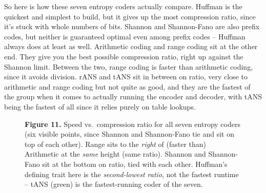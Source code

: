 \documentclass[11pt]{article}
\begin{document}
So here is how these seven entropy coders actually compare. Huffman is the
quickest and simplest to build, but it gives up the most compression ratio,
since it's stuck with whole numbers of bits. Shannon and Shannon-Fano are
also prefix codes, but neither is guaranteed optimal even among prefix codes
-- Huffman always does at least as well. Arithmetic coding and range coding
sit at the other end. They give you the best possible compression ratio,
right up against the Shannon limit. Between the two, range coding is faster
than arithmetic coding, since it avoids division. rANS and tANS sit in
between on ratio, very close to arithmetic and range coding but not quite as
good, and they are the fastest of the group when it comes to actually running
the encoder and decoder, with tANS being the fastest of all since it relies
purely on table lookups.

\begin{figure}[H]
\centering
{}
\caption*{\textbf{Figure 11.} Speed vs.\ compression ratio for all seven
entropy coders (six visible points, since Shannon and Shannon-Fano tie and
sit on top of each other). Range sits to the \emph{right} of (faster than)
Arithmetic at the \emph{same} height (same ratio). Shannon and Shannon-Fano
sit at the bottom on ratio, tied with each other. Huffman's defining trait
here is the \emph{second-lowest ratio}, not the fastest runtime -- tANS
(green) is the fastest-running coder of the seven.}
\end{figure}
\end{document}
